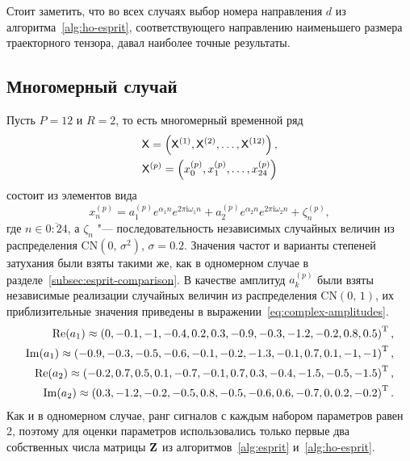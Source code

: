 \documentclass[specialist,
  substylefile=spbu_report.rtx,
subf,href,colorlinks=true, 12pt]{disser}
\theoremstyle{plain}
\theoremstyle{definition}
\theoremstyle{remark}
\newcommand{\iu}{\mathrm{i}}
\begin{document}
Стоит заметить, что во всех случаях выбор номера направления $d$ из
алгоритма~\ref{alg:ho-esprit}, соответствующего направлению наименьшего размера
траекторного тензора, давал наиболее точные результаты.

\subsection{Многомерный случай}\label{subsec:mv-esprit-comparison}
Пусть $P=12$ и $R=2$, то есть многомерный временной ряд
\begin{gather*}
  \mathsf{X} = \left(\mathsf{X}^{(1)}, \mathsf{X}^{(2)}, \ldots, \mathsf{X}^{(12)}\right),\\
  \mathsf{X}^{(p)} = \left(x_0^{(p)}, x_1^{(p)}, \ldots, x_{24}^{(p)}\right)
\end{gather*}
состоит из элементов вида
\[
  x_n^{(p)} = a_1^{(p)} e^{ \alpha_1 n }
  e^{2 \pi \iu \omega_1 n} +
  a_2^{(p)} e^{ \alpha_2 n }
  e^{2 \pi \iu \omega_2 n} + \zeta_n^{(p)},
\]
где $n \in \overline{0:24}$, а $\zeta_n$ "--- последовательность независимых случайных величин из
распределения $\mathrm{CN}(0,\, \sigma^2)$, $\sigma=0.2$.
Значения частот и варианты степеней затухания были взяты такими же, как
в одномерном случае в разделе~\ref{subsec:esprit-comparison}.
В качестве амплитуд $a_k^{(p)}$ были взяты независимые реализации
случайных величин из распределения $\mathrm{CN}(0,\, 1)$,
их приблизительные значения приведены в выражении~\eqref{eq:complex-amplitudes}.
\begin{gather}
  \label{eq:complex-amplitudes}
  \begin{split}
    \operatorname{Re}(a_1) \approx \left( 0, -0.1, -1, -0.4, 0.2, 0.3, -0.9, -0.3, -1.2, -0.2, 0.8, 0.5\right)^{\mathrm{T}}, \\
    \operatorname{Im}(a_1) \approx \left(-0.9, -0.3, -0.5, -0.6, -0.1, -0.2, -1.3, -0.1, 0.7, 0.1, -1, -1 \right)^{\mathrm{T}}, \\
    \operatorname{Re}(a_2) \approx \left( -0.2, 0.7, 0.5, 0.1, -0.7, -0.1, 0.7, 0.3, -0.4, -1.5, -0.5, -1.5\right)^{\mathrm{T}}, \\
    \operatorname{Im}(a_2) \approx \left( 0.3, -1.2, -0.2, -0.5, 0.8, -0.5, -0.6, 0.6, -0.7, 0, 0.2, -0.2\right)^{\mathrm{T}}. \\
  \end{split}
\end{gather}
Как и в одномерном случае, ранг сигналов с каждым набором параметров равен 2,
поэтому для оценки параметров использовались только первые два собственных
числа матрицы $\mathbf{Z}$ из алгоритмов~\ref{alg:esprit} и~\ref{alg:ho-esprit}.
\end{document}
